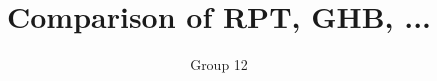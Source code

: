 \documentclass[journal]{IEEEtran}
\begin{document}
\title{Comparison of RPT, GHB, ...}


\author{Group 12}

\maketitle










\appendices






\end{document}
